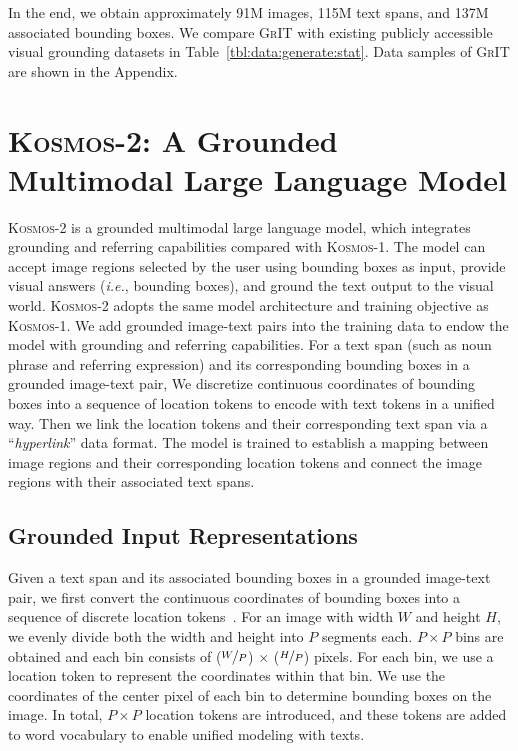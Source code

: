 \documentclass{article}
\newcommand\kosmos{\textsc{Kosmos-1}}
\newcommand\our{\textsc{Kosmos-2}}
\newcommand\ie{\textit{i.e.}}
\begin{document}
In the end, we obtain approximately 91M images, 115M text spans, and 137M associated bounding boxes. 
We compare \textsc{GrIT} with existing publicly accessible visual grounding datasets in Table~\ref{tbl:data:generate:stat}.
Data samples of \textsc{GrIT} are shown in the Appendix.



\section{\our{}: A Grounded Multimodal Large Language Model}
\label{sec:methods}

\our{} is a grounded multimodal large language model, which integrates grounding and referring capabilities compared with \kosmos{}.
The model can accept image regions selected by the user using bounding boxes as input, provide visual answers (\ie, bounding boxes), and ground the text output to the visual world.
\our{} adopts the same model architecture and training objective as \kosmos{}.
We add grounded image-text pairs into the training data to endow the model with grounding and referring capabilities.
For a text span (such as noun phrase and referring expression) and its corresponding bounding boxes in a grounded image-text pair, We discretize continuous coordinates of bounding boxes into a sequence of location tokens to encode with text tokens in a unified way.
Then we link the location tokens and their corresponding text span via a ``\textit{hyperlink}'' data format.
The model is trained to establish a mapping between image regions and their corresponding location tokens and connect the image regions with their associated text spans.


\subsection{Grounded Input Representations}


Given a text span and its associated bounding boxes in a grounded image-text pair, we first convert the continuous coordinates of bounding boxes into a sequence of discrete location tokens~\cite{pix2seq}.
For an image with width $W$ and height $H$, we evenly divide both the width and height into $P$ segments each. 
$P \times P$ bins are obtained and each bin consists of ($\nicefrac{W}{P}$) $\times$ ($\nicefrac{H}{P}$) pixels.
For each bin, we use a location token to represent the coordinates within that bin.
We use the coordinates of the center pixel of each bin to determine bounding boxes on the image.
In total, $P \times P$ location tokens are introduced, and these tokens are added to word vocabulary to enable unified modeling with texts.
\end{document}
